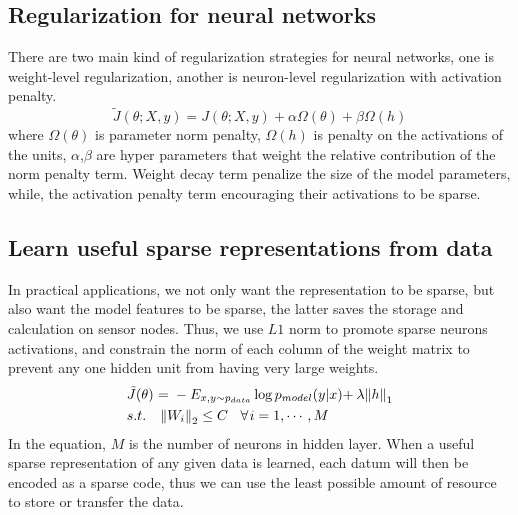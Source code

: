 \subsection{Regularization for neural networks}

There are two main kind of regularization strategies for neural networks, one is weight-level regularization, another is neuron-level regularization with activation penalty.
\begin{equation}
\tilde J(\theta ;X,y) = J(\theta ;X,y) + \alpha \Omega (\theta )+ \beta \Omega (h)
\end{equation}
where $\Omega (\theta )$ is parameter norm penalty, $\Omega (h)$ is penalty on the activations of the units, $\alpha$,$\beta$ are hyper parameters that weight the relative contribution of
the norm penalty term. Weight decay term penalize the size of the model parameters, while, the activation penalty term encouraging their activations to be sparse.

\subsection{Learn useful sparse representations from data}
In practical applications, we not only want the representation to be sparse, but also want the model features to be sparse, the latter saves the storage and calculation on sensor nodes. Thus, we use $L1$ norm to promote sparse neurons activations, and constrain the norm of each column of the weight matrix to prevent any one hidden unit from having very large weights.
\begin{equation}
\begin{split}
&\tilde J(\theta ){\kern 1pt} {\kern 1pt} {\kern 1pt} {\rm{ = }}{\kern 1pt} {\kern 1pt} {\kern 1pt}  - {E_{x,y \sim {p_{data}}}}\log {p_{model}}(y|x){\rm{ + }}{\kern 1pt} {\kern 1pt} \lambda {\left\| h \right\|_1}\\
& s.t.{\kern 1pt} {\kern 1pt} {\kern 1pt} {\kern 1pt} {\kern 1pt} {\kern 1pt} {\kern 1pt} {\kern 1pt} {\kern 1pt} {\kern 1pt} {\left\| {{W_i}} \right\|_2} \le C{\kern 1pt} {\kern 1pt} {\kern 1pt} {\kern 1pt} {\kern 1pt} {\kern 1pt} {\kern 1pt} {\kern 1pt} {\kern 1pt} \forall {\kern 1pt} i = 1, \cdots ,M\\
\end{split}
\end{equation}
In the equation, $M$ is the number of neurons in hidden layer.
When a useful sparse representation of any given data is learned, each datum will then be encoded as a sparse code, thus we can use the least possible amount of resource to store or transfer the data.

